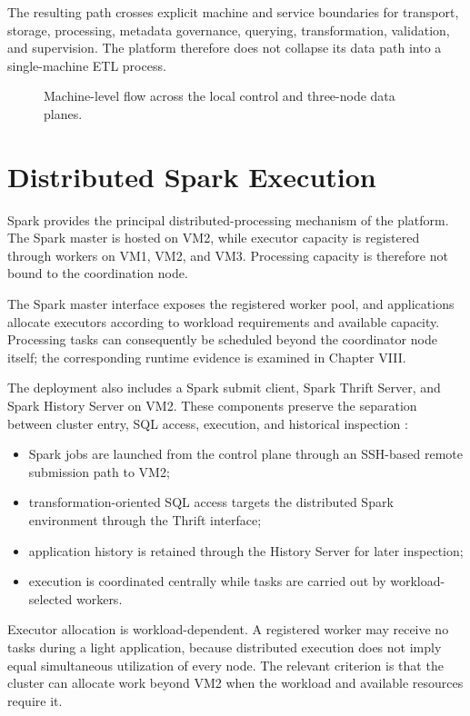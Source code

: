 The resulting path crosses explicit machine and service boundaries for transport, storage, processing, metadata governance, querying, transformation, validation, and supervision. The platform therefore does not collapse its data path into a single-machine ETL process.

\begin{figure}[H]
    \centering
    
    \caption{Machine-level flow across the local control and three-node data planes.}
    \label{fig:chapter6-machine-data-flow}
\end{figure}

\section{Distributed Spark Execution}
Spark provides the principal distributed-processing mechanism of the platform. The Spark master is hosted on VM2, while executor capacity is registered through workers on VM1, VM2, and VM3. Processing capacity is therefore not bound to the coordination node.

The Spark master interface exposes the registered worker pool, and applications allocate executors according to workload requirements and available capacity. Processing tasks can consequently be scheduled beyond the coordinator node itself; the corresponding runtime evidence is examined in Chapter VIII.

The deployment also includes a Spark submit client, Spark Thrift Server, and Spark History Server on VM2. These components preserve the separation between cluster entry, SQL access, execution, and historical inspection \cite{apache_spark_docs}:
\begin{itemize}
    \item Spark jobs are launched from the control plane through an SSH-based remote submission path to VM2;
    \item transformation-oriented SQL access targets the distributed Spark environment through the Thrift interface;
    \item application history is retained through the History Server for later inspection;
    \item execution is coordinated centrally while tasks are carried out by workload-selected workers.
\end{itemize}

Executor allocation is workload-dependent. A registered worker may receive no tasks during a light application, because distributed execution does not imply equal simultaneous utilization of every node. The relevant criterion is that the cluster can allocate work beyond VM2 when the workload and available resources require it.

